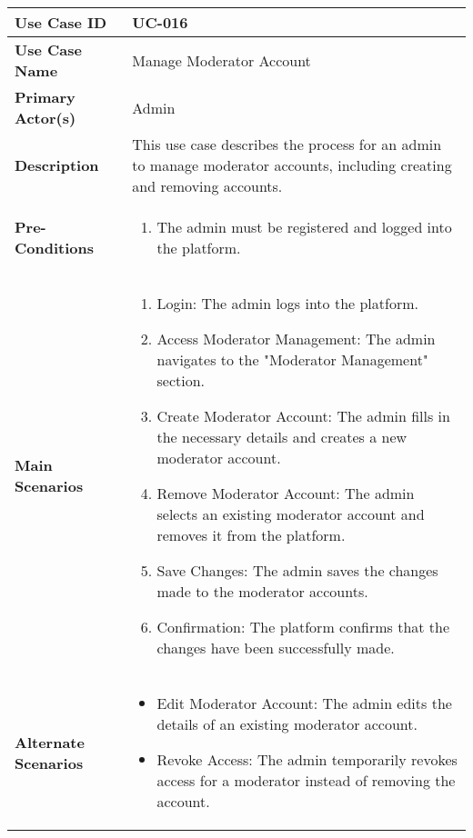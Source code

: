 \begin{table}[!ht]
    \centering
    \renewcommand{\arraystretch}{1.3} %
    \begin{tabularx}{\textwidth}{|l|X|}
        \hline
        \textbf{Use Case ID} & UC-016 \\
        \hline
        \textbf{Use Case Name} & Manage Moderator Account \\
        \hline
        \textbf{Primary Actor(s)} & Admin \\
        \hline
        \textbf{Description} & This use case describes the process for an admin to manage moderator accounts, including creating and removing accounts. \\
        \hline
        \textbf{Pre-Conditions} & 
        \begin{enumerate}[label=\arabic*.,itemsep=0pt]
            \item The admin must be registered and logged into the platform.
        \end{enumerate} \\
        \hline
        \textbf{Main Scenarios} & 
        \begin{enumerate}[label=\arabic*.,itemsep=0pt]
            \item Login: The admin logs into the platform.
            \item Access Moderator Management: The admin navigates to the "Moderator Management" section.
            \item Create Moderator Account: The admin fills in the necessary details and creates a new moderator account.
            \item Remove Moderator Account: The admin selects an existing moderator account and removes it from the platform.
            \item Save Changes: The admin saves the changes made to the moderator accounts.
            \item Confirmation: The platform confirms that the changes have been successfully made.
        \end{enumerate} \\
        \hline
        \textbf{Alternate Scenarios} & 
        \begin{itemize}[label=--,itemsep=0pt]
            \item Edit Moderator Account: The admin edits the details of an existing moderator account.
            \item Revoke Access: The admin temporarily revokes access for a moderator instead of removing the account.

\end{itemize}
\end{tabularx}
\end{table}
